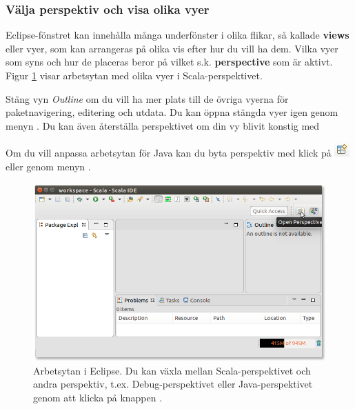 \subsubsection{Välja perspektiv och visa olika vyer}

Eclipse-fönstret kan innehålla många underfönster i olika flikar, så kallade \textbf{views} eller vyer, som kan arrangeras på olika vis efter hur du vill ha dem. Vilka vyer som syns och hur de placeras beror på vilket s.k. \textbf{perspective} som är aktivt.  Figur \ref{fig:appendix:eclipse:open-perspective} visar arbetsytan med olika vyer i Scala-perspektivet.

Stäng vyn \textit{Outline} om du vill ha mer plats till de övriga vyerna för paketnavigering, editering och utdata. Du kan öppna stängda vyer igen genom menyn .
Du kan även återställa perspektivet om din vy blivit konstig med 

Om du vill anpassa arbetsytan för Java kan du byta perspektiv med klick på \includegraphics[scale=0.75]{../img/eclipse/eclipse-perspective-button.png} eller genom menyn .

\begin{figure}
\centering
\includegraphics[width=1.0\textwidth]{../img/eclipse/eclipse-scala-perspective.png}
\caption{Arbetsytan i Eclipse. Du kan växla mellan Scala-perspektivet och andra perspektiv, t.ex. Debug-perspektivet eller Java-perspektivet genom att klicka på knappen .}
\label{fig:appendix:eclipse:open-perspective}
\end{figure}

